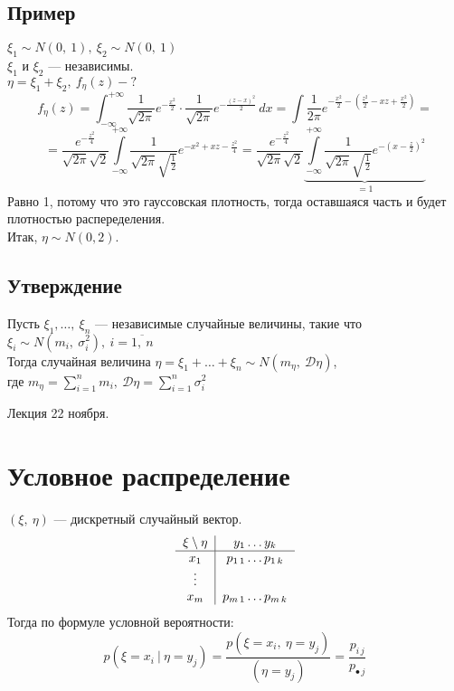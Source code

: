 \documentclass[12pt, a4paper]{article}
\begin{document}
    \subsection*{Пример}
    $\xi_1 \sim N(0,\ 1),\ \xi_2 \sim N(0,\ 1)$\\
    $\xi_1$ и $\xi_2$ --- независимы.\\
    $\eta = \xi_1 + \xi_2,\ f_{\eta}(z) - ?$
    \[f_{\eta}(z) = \int_{-\infty}^{+\infty} \frac{1}{\sqrt{2\pi}} e^{-\frac{x^2}{2}}\cdot \frac{1}{\sqrt{2\pi}} e^{-\frac{(z - x)^2}{2}}\, dx = \int\frac{1}{2\pi}e^{-\frac{x^2}{2} - \left( \frac{z^2}{2} - xz + \frac{x^2}{2} \right)}=\]
    \[=\frac{e^{-\frac{z^2}{4}}}{\sqrt{2\pi}\sqrt{2}} \int\limits_{-\infty}^{+\infty} \frac{1}{\sqrt{2\pi}\sqrt{\frac{1}{2}}} e^{-x^2 + xz - \frac{z^2}{4}} = \frac{e^{-\frac{z^2}{4}}}{\sqrt{2\pi}\sqrt{2}} \underset{=1}{\underbrace{\int\limits_{-\infty}^{+\infty} \frac{1}{\sqrt{2\pi}\sqrt{\frac{1}{2}}} e^{-(x - \frac{z}{2})^2}}}\]
    Равно 1, потому что это гауссовская плотность, тогда оставшаяся часть и будет плотностью распеределения.\\
    Итак, $\eta \sim N(0, 2)$.
    \subsection*{Утверждение}
    Пусть $\xi_1,\dots,\ \xi_n$ --- независимые случайные величины, такие что $\xi_i\sim N(m_i,\ \sigma_i^2),\ i = \overline{1,\ n}$\\
    Тогда случайная величина $\eta = \xi_1 + \dots + \xi_n \sim N(m_{\eta},\ \mathcal{D}\eta)$,\\
    где $\displaystyle m_{\eta} = \sum_{i = 1}^{n} m_i,\ \mathcal{D}\eta = \sum_{i = 1}^{n} \sigma_i^2$
    \begin{center}
        Лекция 22 ноября.
    \end{center}
    \section*{Условное распределение}
    $(\xi,\ \eta)$ --- дискретный случайный вектор.
    \[\begin{tabular}{c|c}
        $\xi \setminus \eta$ & $y_1\dots y_k$\\
        \hline
        $x_1$                & $p_{1\, 1}\dots p_{1\, k}$\\
        $\vdots$             & \\
        $x_m$                & $p_{m\, 1}\dots p_{m\, k}$
    \end{tabular}\]
    Тогда по формуле условной вероятности:
    \[p(\xi = x_i\ \big|\ \eta = y_j) = \frac{p(\xi = x_i,\ \eta = y_j)}{(\eta = y_j)} = \frac{p_{i\, j}}{p_{\bullet\, j}}\]
\end{document}
